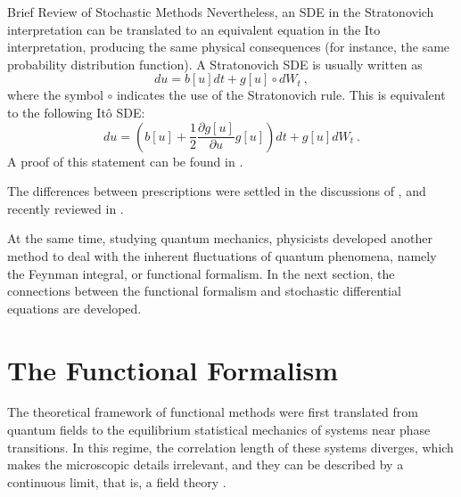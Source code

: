 \begin{chapter}{Brief Review of Stochastic Methods}
Nevertheless, an SDE in the Stratonovich interpretation can be translated
to an equivalent equation in the Ito interpretation,
producing the same physical consequences (for instance, the same probability distribution function).
A Stratonovich SDE is usually written as
\begin{equation}
    du = b[u] dt + g[u] \circ dW_t \ ,
\end{equation}
where the symbol $\circ$ indicates the use
of the Stratonovich rule. This is equivalent to the following
Itô SDE:
\begin{equation}
    du = \left( b[u] + \frac12 \frac{\partial g[u]}{\partial u} g[u] \right) dt + g[u] dW_t \ .
\end{equation}
A proof of this statement can be found in \textcite[sec.6.5.6]{evans2012}.

The differences between prescriptions were settled
in the discussions of \textcite{vankampen1981,vankampen1992},
and recently reviewed in \textcite{mannella2012}.

At the same time, studying quantum mechanics, physicists developed another method
to deal with the inherent fluctuations of quantum phenomena, namely
the Feynman integral, or functional formalism. In the next section,
the connections between the functional formalism and
stochastic differential equations are developed.

\section{The Functional Formalism}

The theoretical framework of functional methods
were first translated from quantum fields to the
equilibrium statistical mechanics of systems near phase transitions.
In this regime, the correlation length of these systems diverges,
which makes the microscopic details irrelevant, and they
can be described by a continuous limit, that is, a field theory
\parencite{zinn2002,amit2005,mussardo2010}.


\end{chapter}
